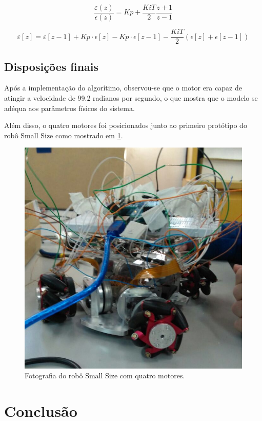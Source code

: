 \documentclass[a4paper,11pt]{article}
\begin{document}
		\begin{equation}
			\frac{\varepsilon(z)}{\epsilon(z)}= Kp + \frac{Ki T}{2}\frac{z+1}{z-1} \label{tfdiscreta}
		\end{equation}
			
		\begin{equation}
			\varepsilon[z] = \varepsilon[z-1] + Kp\cdot\epsilon[z] - Kp\cdot\epsilon[z-1] - \frac{Ki T}{2}(\epsilon[z] + \epsilon[z-1])
		\end{equation}
		
		\subsection{Disposições finais}
		
		Após a implementação do algorítimo, observou-se que o motor era capaz de atingir a velocidade de 99.2 radianos por segundo, o que mostra que o modelo se adéqua aos parâmetros físicos do sistema.
		
		Além disso, o quatro motores foi posicionados junto ao primeiro protótipo do robô Small Size como mostrado em \ref{fig:smallfoto}.
		
		\begin{figure}[ht]
			\centering
			\includegraphics[width=0.7\linewidth]{images/smallfoto}
			\caption{Fotografia do robô Small Size com quatro motores.}
			\label{fig:smallfoto}
		\end{figure}
		
	\section{Conclusão}
	
\end{document}
